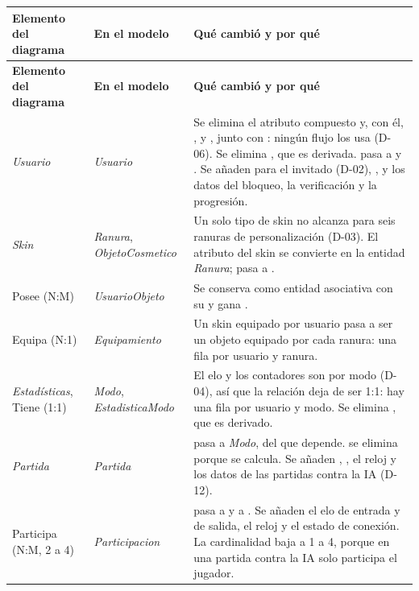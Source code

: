 \begin{center}\small
\begin{longtable}{|L{0.21\textwidth}|L{0.30\textwidth}|L{0.39\textwidth}|}
\hline
\textbf{Elemento del diagrama} & \textbf{En el modelo} & \textbf{Qué cambió y por qué} \\ \hline
\endfirsthead
\hline
\textbf{Elemento del diagrama} & \textbf{En el modelo} & \textbf{Qué cambió y por qué} \\ \hline
\endhead
\textit{Usuario} & \textit{Usuario} & Se elimina el atributo compuesto  y, con él, ,  y , junto con : ningún flujo los usa (\mbox{D-06}). Se elimina , que es derivada.  pasa a  y . Se añaden  para el invitado (\mbox{D-02}), , y los datos del bloqueo, la verificación y la progresión. \\ \hline
\textit{Skin} & \textit{Ranura}, \textit{ObjetoCosmetico} & Un solo tipo de skin no alcanza para seis ranuras de personalización (\mbox{D-03}). El atributo  del skin se convierte en la entidad \textit{Ranura};  pasa a . \\ \hline
Posee (N:M) & \textit{UsuarioObjeto} & Se conserva como entidad asociativa con su  y gana . \\ \hline
Equipa (N:1) & \textit{Equipamiento} & Un skin equipado por usuario pasa a ser un objeto equipado por cada ranura: una fila por usuario y ranura. \\ \hline
\textit{Estadísticas}, Tiene (1:1) & \textit{Modo}, \textit{EstadisticaModo} & El elo y los contadores son por modo (\mbox{D-04}), así que la relación deja de ser 1:1: hay una fila por usuario y modo. Se elimina , que es derivado. \\ \hline
\textit{Partida} & \textit{Partida} &  pasa a \textit{Modo}, del que depende.  se elimina porque se calcula. Se añaden , , el reloj y los datos de las partidas contra la IA (\mbox{D-12}). \\ \hline
Participa (N:M, 2 a 4) & \textit{Participacion} &  pasa a  y  a . Se añaden el elo de entrada y de salida, el reloj y el estado de conexión. La cardinalidad baja a 1 a 4, porque en una partida contra la IA solo participa el jugador. \\ \hline

\end{longtable}
\end{center}
